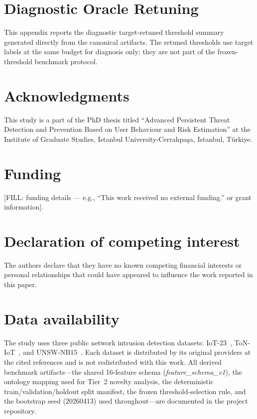 \documentclass[preprint,12pt]{elsarticle}
\begin{document}
\appendix
\section{Diagnostic Oracle Retuning}
\label{app:oracle-retuning}

This appendix reports the diagnostic target-retuned threshold summary generated directly from the canonical artifacts. The retuned thresholds use target labels at the same \FrozenFprTarget{} budget for diagnosis only; they are not part of the frozen-threshold benchmark protocol.


\FloatBarrier

\section*{Acknowledgments}

This study is a part of the PhD thesis titled ``Advanced Persistent Threat Detection and Prevention Based on User Behaviour and Risk Estimation'' at the Institute of Graduate Studies, Istanbul University-Cerrahpa\c{s}a, Istanbul, T\"urkiye.

\section*{Funding}

[FILL: funding details --- e.g., ``This work received no external funding.'' or grant information].

\section*{Declaration of competing interest}

The authors declare that they have no known competing financial interests or personal relationships that could have appeared to influence the work reported in this paper.

\section*{Data availability}

The study uses three public network intrusion detection datasets: IoT-23~\cite{garcia2020iot23}, ToN-IoT~\cite{booij2022ton}, and UNSW-NB15~\cite{moustafa2015unsw}. Each dataset is distributed by its original providers at the cited references and is not redistributed with this work. All derived benchmark artifacts---the shared 16-feature schema (\emph{feature\_schema\_v1}), the ontology mapping used for Tier~2 novelty analysis, the deterministic train/validation/holdout split manifest, the frozen threshold-selection rule, and the bootstrap seed (20260413) used throughout---are documented in the project repository.
\end{document}
